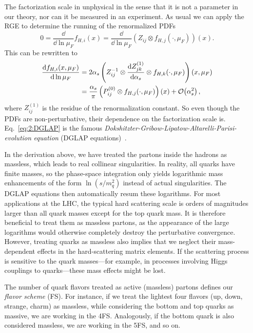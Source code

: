 The factorization scale in unphysical in the sense that it is not a parameter in our theory, nor can it be measured in an experiment. As usual we can apply the \acs{RGE} to determine the running of the renormalized \acs{PDF}s
\begin{equation}
0 = \frac{\dd}{\dd \ln \mu_F} f_{H,i}(x) = \frac{\dd}{\dd \ln \mu_F} (Z_{ij} \otimes f_{H, j}(\cdot, \mu_F))(x).
\end{equation}
This can be rewritten to
\begin{equation}
\begin{split}
\frac{\mathrm{d} f_{H,i}(x, \mu_F)}{\mathrm{d} \ln \mu_F} &=  2 \alpha_s \left(Z_{ij}^{-1} \otimes \frac{\mathrm{d} Z_{jk}^{(1)}}{\mathrm{d} \alpha_s} \otimes f_{H,k}(\cdot, \mu_F) \right)(x, \mu_F) \\
&= \frac{\alpha_s}{\pi} \left(P_{ij}^{(0)} \otimes f_{H,j}(\cdot, \mu_F) \right)(x) + \mathcal{O}\!\left(\alpha_s^2\right),
\label{eq:2:DGLAP}
\end{split}
\end{equation}
where $Z^{(1)}_{ij}$ is the residue of the renormalization constant. So even though the \acs{PDF}s are non-perturbative, their dependence on the factorization scale is. Eq.~\eqref{eq:2:DGLAP} is the famous \textit{Dokshitzter-Gribow-Lipatow-Altarelli-Parisi-evolution equation} (DGLAP equations)~\cite{Dokshitzer:1977sg,Gribov:1972ri,Altarelli:1977zs}.

In the derivation above, we have treated the partons inside the hadrons as massless, which leads to real collinear singularities. In reality, all quarks have finite masses, so the phase-space integration only yields logarithmic mass enhancements of the form $\ln (\hat{s}/m_q^2)$ instead of actual singularities. The DGLAP equations then automatically resum these logarithms. For most applications at the \acs{LHC}, the typical hard scattering scale is orders of magnitudes larger than all quark masses except for the top quark mass. It is therefore beneficial to treat them as massless partons, as the appearance of the large logarithms would otherwise completely destroy the perturbative convergence. However, treating quarks as massless also implies that we neglect their mass-dependent effects in the hard-scattering matrix elements. If the scattering process is sensitive to the quark masses---for example, in processes involving Higgs couplings to quarks---these mass effects might be lost.

The number of quark flavors treated as active (massless) partons defines our \textit{flavor scheme} (\acs{FS}). For instance, if we treat the lightest four flavors (up, down, strange, charm) as massless, while considering the bottom and top quarks as massive, we are working in the 4\acs{FS}. Analogously, if the bottom quark is also considered massless, we are working in the 5\acs{FS}, and so on.

